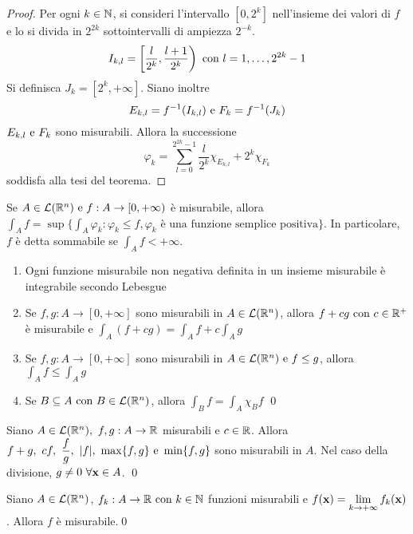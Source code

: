 \begin{proof}
	Per ogni $k\in \mathbb{N}$, si consideri l'intervallo $[0,2^k]$ nell'insieme dei valori di $f$ e lo si divida in $2^{2k}$ sottointervalli di ampiezza $2^{-k}$.
	$$
		I_{k,l}=\left[\frac{l}{2^k},\frac{l+1}{2^k}\right) \text{ con } l=1,\dots,2^{2k}-1
	$$
	Si definisca $J_k=[2^k,+\infty]$. Siano inoltre
	$$
		E_{k,l}=f^{-1}(I_{k,l}) \text{ e } F_k=f^{-1}(J_k)
	$$
	$E_{k,l} \text{ e } F_k$ sono misurabili. Allora la successione
	$$
		\varphi_k=\sum_{l=0}^{2^{2k}-1}\frac{l}{2^k}\chi_{E_{k,l}}+2^k\chi_{F_k}
	$$
	soddisfa alla tesi del teorema.   
\end{proof}

\begin{definition}
	Se $A\in \mathcal{L}(\mathbb{R}^n) \text{ e } f:A\to [0,+\infty)$ è misurabile, allora $\int_Af=\sup\{\int_A \varphi_k:\varphi_k \leq f, \varphi_k \text{ è una funzione semplice positiva}\}$. In particolare, $f$ è detta sommabile se $\int_A f<+\infty$.
\end{definition}

\begin{theorem}\leavevmode
	\begin{enumerate}
		\item Ogni funzione misurabile non negativa definita in un insieme misurabile è integrabile secondo Lebesgue
		\item Se $f,g:A\to [0,+\infty]$ sono misurabili in $A\in \mathcal{L}(\mathbb{R}^n)$, allora $f+cg \text{ con } c \in \mathbb{R}^+$ è misurabile e $\int_A (f+cg)=\int_Af+c\int_Ag$
		\item Se $f,g:A\to[0,+\infty]$ sono misurabili in $A\in\mathcal{L}(\mathbb{R}^n) \text{ e } f\leq g$, allora $\int_Af\leq\int_Ag$
		\item Se $B\subseteq A \text{ con } B\in \mathcal{L}(\mathbb{R}^n)$, allora $\int_Bf=\int_A\chi_Bf$
		\qed
	\end{enumerate}
\end{theorem}

\begin{theorem}
	Siano $A \in \mathcal{L}(\R^n), \ f,g:A\to\R$ misurabili e $c \in \mathbb{R}$. Allora $f+g,\ cf,\ \dfrac{f}{g},\ \abs{f},\ \max\{f,g\} \e \min\{f,g\}$ sono misurabili in $A$. Nel caso della divisione, $g\neq 0 \ \forall \vb{x} \in A$.
	\qed
\end{theorem}

\begin{theorem}
	Siano $A \in \mathcal{L}(\mathbb{R}^n)$, $f_k:A\to\mathbb{R} \text{ con } k \in \mathbb{N}$ funzioni misurabili e $f(\vb{x})=\lim\limits_{k\to+\infty}f_k(\vb{x})$. Allora $f$ è misurabile.\qed
\end{theorem}


